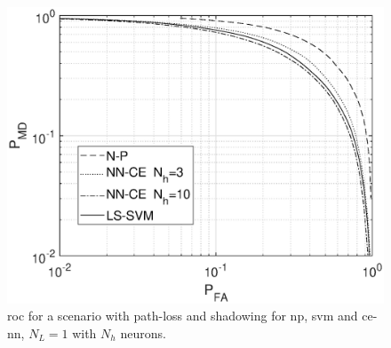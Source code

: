 \documentclass[draftcls,onecolumn,12pt]{IEEEtran}
\begin{document}
\begin{figure}[t]
    \centering
    \includegraphics[width=0.6\columnwidth]{res_NP_approx_SVM.eps}
    \caption{\ac{roc} for a scenario with path-loss and shadowing for \ac{np}, \ac{svm} and \ac{ce}-\ac{nn}, $N_L = 1$ with $N_h$ neurons.}
    \label{fig:trueMap}
\end{figure}
\end{document}
